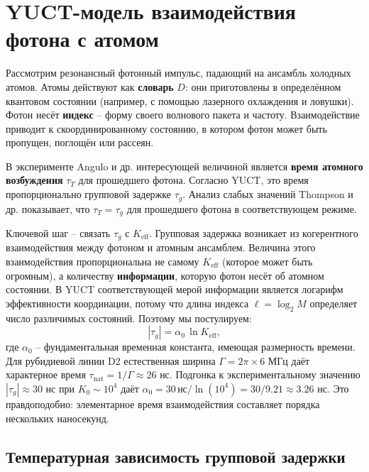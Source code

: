 \documentclass[12pt,a4paper]{article}
\newcommand{\Keff}{K_{\mathrm{eff}}}
\begin{document}
	\section{YUCT-модель взаимодействия фотона с атомом}
	
	Рассмотрим резонансный фотонный импульс, падающий на ансамбль холодных атомов. Атомы действуют как \textbf{словарь} \(D\): они приготовлены в определённом квантовом состоянии (например, с помощью лазерного охлаждения и ловушки). Фотон несёт \textbf{индекс} – форму своего волнового пакета и частоту. Взаимодействие приводит к скоординированному состоянию, в котором фотон может быть пропущен, поглощён или рассеян.
	
	В эксперименте Angulo и др. \cite{Angulo2024} интересующей величиной является \textbf{время атомного возбуждения} \(\tau_T\) для прошедшего фотона. Согласно YUCT, это время пропорционально групповой задержке \(\tau_g\). Анализ слабых значений Thompson и др. \cite{Thompson2023} показывает, что \(\tau_T = \tau_g\) для прошедшего фотона в соответствующем режиме.
	
	Ключевой шаг – связать \(\tau_g\) с \(\Keff\). Групповая задержка возникает из когерентного взаимодействия между фотоном и атомным ансамблем. Величина этого взаимодействия пропорциональна не самому \(\Keff\) (которое может быть огромным), а количеству \textbf{информации}, которую фотон несёт об атомном состоянии. В YUCT соответствующей мерой информации является логарифм эффективности координации, потому что длина индекса \(\ell = \log_2 M\) определяет число различимых состояний. Поэтому мы постулируем:
	\begin{equation}
		|\tau_g| = \alpha_0 \, \ln\Keff,
		\label{eq:tau_log}
	\end{equation}
	где \(\alpha_0\) – фундаментальная временная константа, имеющая размерность времени. Для рубидиевой линии D2 естественная ширина \(\Gamma = 2\pi \times 6\) МГц даёт характерное время \(\tau_{\text{nat}} = 1/\Gamma \approx 26\) нс. Подгонка к экспериментальному значению \(|\tau_g| \approx 30\) нс при \(K_0 \sim 10^4\) даёт \(\alpha_0 = 30\,\text{нс} / \ln(10^4) = 30 / 9.21 \approx 3.26\) нс. Это правдоподобно: элементарное время взаимодействия составляет порядка нескольких наносекунд.
	
	\subsection{Температурная зависимость групповой задержки}
	
\end{document}
